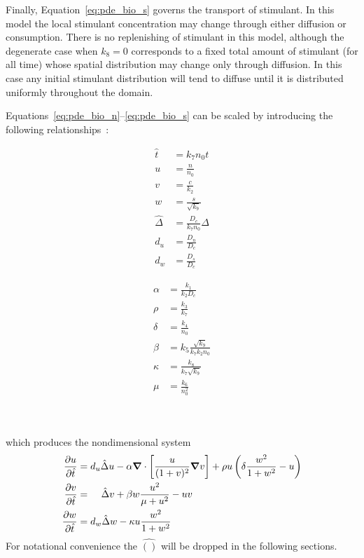 Finally, Equation~\eqref{eq:pde_bio_s} governs the transport of stimulant.  In this model the local stimulant concentration may change through either diffusion or consumption.  There is no replenishing of stimulant in this model, although the degenerate case when $k_8=0$ corresponds to a fixed total amount of stimulant (for all time) whose spatial distribution may change only through diffusion.  In this case any initial stimulant distribution will tend to diffuse until it is distributed uniformly throughout the domain.

Equations~\eqref{eq:pde_bio_n}--\eqref{eq:pde_bio_s} can be scaled by introducing the following relationships~\cite{spatial_patters_in_bio}:
\\ %
\begin{minipage}[t]{.44\columnwidth}
  \begin{align}
    \hat{t} &= k_7 n_0 t \\
    u &= \frac{n}{n_0} \label{eq:bio_u_nondim}\\
    v &= \frac{c}{k_2} \\
    w &= \frac{s}{\sqrt{k_9}} \\
    \hat{\Delta} &= \frac{D_c}{k_7 n_0} \Delta \\
    d_u &= \frac{D_n}{D_c} \\
    d_w &= \frac{D_s}{D_c} 
  \end{align}
\end{minipage}
\hspace{.1\columnwidth}
\begin{minipage}[t]{.44\columnwidth}
  \begin{align}
    \alpha &= \frac{k_1}{k_2 D_c} \\
    \rho &= \frac{k_3}{k_7} \\
    \delta &= \frac{k_4}{n_0} \\
    \beta &= k_5 \frac{\sqrt{k_9}}{k_7 k_2 n_0} \\
    \kappa &= \frac{k_8}{k_7\sqrt{k_9}} \\
    \mu &= \frac{k_6}{n_0^2}
  \end{align}
\end{minipage}
\\
\\
which produces the nondimensional system
\begin{align}
  \label{eq:pde_bio_u}
  {\frac{\partial{u}}{\partial{\hat{t}}}} & = d_u \hat{\Delta} u - \alpha {\boldsymbol{\nabla}} {}\cdot \left[ \frac{u}{(1+ v)^2} {\boldsymbol{\nabla}} {v} \right]
                                    + \rho u \left( \delta \frac{w^2}{1 + w^2} - u \right) \\
  \label{eq:pde_bio_v}
  {\frac{\partial{v}}{\partial{\hat{t}}}} & = \;\;\;\; \hat{\Delta} v + \beta w \frac{u^2}{\mu + u^2} - uv \\
  \label{eq:pde_bio_w}
  {\frac{\partial{w}}{\partial{\hat{t}}}} & = d_w \hat{\Delta} w - \kappa u \frac{w^2}{1 + w^2}
\end{align}
For notational convenience the $\hat{()}$ will be dropped in the following sections.

